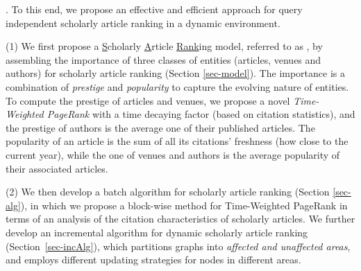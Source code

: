 .
To this end, we propose an effective and efficient approach for query independent scholarly article ranking in a dynamic environment.

\sstab(1) We first  propose a \underline{S}cholarly \underline{A}rticle \underline{Rank}ing model, referred to as \ensemblerank, by assembling the importance of three classes of entities (articles, venues and authors) for scholarly article ranking (Section \ref{sec-model}).
%
The importance is a combination of {\em prestige} and {\em popularity} to capture the evolving nature of entities.
%
To compute the prestige of articles and venues, we propose a novel {\em Time-Weighted PageRank} with a time decaying factor (based on citation statistics), and the prestige of authors is the average one of their published articles.
%
The popularity of an article is the sum of all its citations' freshness (how close to the current year), while the one of venues and authors is the average popularity of their associated articles.
%


\sstab(2)  We then develop  a batch algorithm for scholarly article ranking (Section \ref{sec-alg}), in which we propose a block-wise method for Time-Weighted PageRank in terms of an analysis of the citation characteristics of scholarly articles.
%
We further develop an incremental algorithm for dynamic scholarly article ranking (Section~\ref{sec-incAlg}), which partitions graphs into  {\em affected and unaffected areas}, and employs different updating strategies for nodes in different areas.


%




